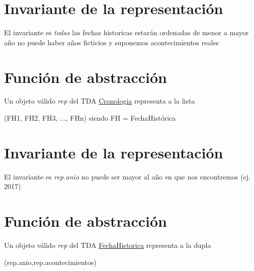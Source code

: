 \hypertarget{repConjunto_invConjunto}{}\section{Invariante de la representación}\label{repConjunto_invConjunto}
El invariante es {\itshape todas} las fechas historicas estarán ordenadas de menor a mayor año no puede haber años ficticios y suponemos acontecimientos reales\hypertarget{repConjunto_faConjunto}{}\section{Función de abstracción}\label{repConjunto_faConjunto}
Un objeto válido {\itshape rep} del T\+DA \hyperlink{classCronologia}{Cronologia} representa a la lista

(F\+H1, F\+H2, F\+H3, ..., F\+Hn) siendo FH = Fecha\+Histórica\hypertarget{repConjunto_invConjunto}{}\section{Invariante de la representación}\label{repConjunto_invConjunto}
El invariante es {\itshape rep.\+anio} no puede ser mayor al año en que nos encontremos (ej. 2017)\hypertarget{repConjunto_faConjunto}{}\section{Función de abstracción}\label{repConjunto_faConjunto}
Un objeto válido {\itshape rep} del T\+DA \hyperlink{classFechaHistorica}{Fecha\+Historica} representa a la dupla

(rep.\+anio,rep.\+acontecimientos) 